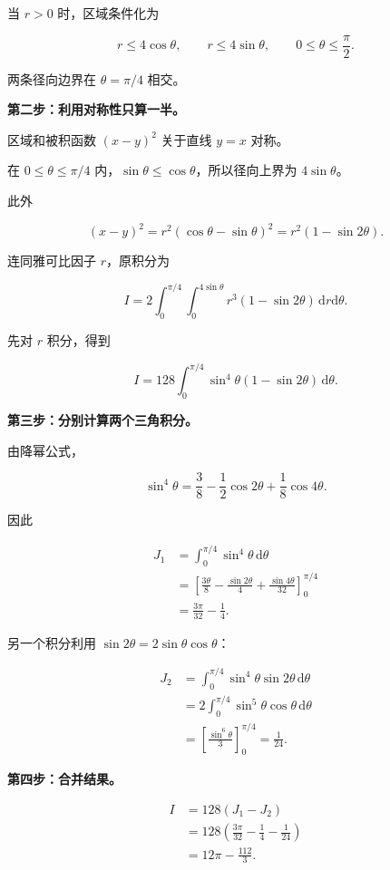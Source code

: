 \documentclass[UTF8,11pt,fontset=windows]{ctexart}
\begin{document}
当 $r>0$ 时，区域条件化为

$$
r\le4\cos\theta,\qquad r\le4\sin\theta,
\qquad 0\le\theta\le\frac\pi2.
$$

两条径向边界在 $\theta=\pi/4$ 相交。

\textbf{第二步：利用对称性只算一半。}

区域和被积函数 $(x-y)^2$ 关于直线 $y=x$ 对称。

在 $0\le\theta\le\pi/4$ 内，$\sin\theta\le\cos\theta$，所以径向上界为 $4\sin\theta$。

此外

$$
(x-y)^2=r^2(\cos\theta-\sin\theta)^2
=r^2(1-\sin2\theta).
$$

连同雅可比因子 $r$，原积分为

$$
I=2\int_0^{\pi/4}\int_0^{4\sin\theta}
 r^3(1-\sin2\theta)\,\mathrm dr\mathrm d\theta.
$$

先对 $r$ 积分，得到

$$
I=128\int_0^{\pi/4}\sin^4\theta(1-\sin2\theta)\,\mathrm d\theta.
$$

\textbf{第三步：分别计算两个三角积分。}

由降幂公式，

$$
\sin^4\theta=\frac38-\frac12\cos2\theta+\frac18\cos4\theta.
$$

因此

$$
\begin{aligned}
J_1&=\int_0^{\pi/4}\sin^4\theta\,\mathrm d\theta\\
&=\left[\frac{3\theta}{8}-\frac{\sin2\theta}{4}
+\frac{\sin4\theta}{32}\right]_0^{\pi/4}\\
&=\frac{3\pi}{32}-\frac14.
\end{aligned}
$$

另一个积分利用 $\sin2\theta=2\sin\theta\cos\theta$：

$$
\begin{aligned}
J_2&=\int_0^{\pi/4}\sin^4\theta\sin2\theta\,\mathrm d\theta\\
&=2\int_0^{\pi/4}\sin^5\theta\cos\theta\,\mathrm d\theta\\
&=\left[\frac{\sin^6\theta}{3}\right]_0^{\pi/4}
=\frac1{24}.
\end{aligned}
$$

\textbf{第四步：合并结果。}

$$
\begin{aligned}
I&=128(J_1-J_2)\\
&=128\left(\frac{3\pi}{32}-\frac14-\frac1{24}\right)\\
&=\boxed{12\pi-\frac{112}{3}}.
\end{aligned}
$$
\end{document}
